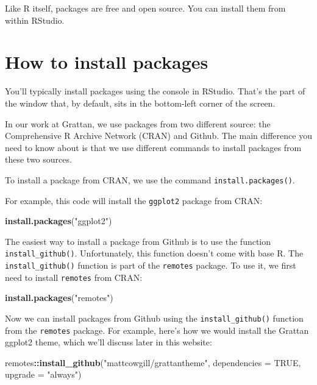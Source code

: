 \documentclass[]{book}
\newenvironment{Shaded}{\begin{snugshade}}{\end{snugshade}}
\newcommand{\DataTypeTok}[1]{\textcolor[rgb]{0.13,0.29,0.53}{#1}}
\newcommand{\KeywordTok}[1]{\textcolor[rgb]{0.13,0.29,0.53}{\textbf{#1}}}
\newcommand{\NormalTok}[1]{#1}
\newcommand{\OperatorTok}[1]{\textcolor[rgb]{0.81,0.36,0.00}{\textbf{#1}}}
\newcommand{\OtherTok}[1]{\textcolor[rgb]{0.56,0.35,0.01}{#1}}
\newcommand{\StringTok}[1]{\textcolor[rgb]{0.31,0.60,0.02}{#1}}
\begin{document}
Like R itself, packages are free and open source. You can install them from within RStudio.

\hypertarget{install-packages}{%
\section{How to install packages}\label{install-packages}}

You'll typically install packages using the console in RStudio. That's the part of the window that, by default, sits in the bottom-left corner of the screen.

In our work at Grattan, we use packages from two different source: the Comprehensive R Archive Network (CRAN) and Github. The main difference you need to know about is that we use different commands to install packages from these two sources.

To install a package from CRAN, we use the command \texttt{install.packages()}.

For example, this code will install the \texttt{ggplot2} package from CRAN:

\begin{Shaded}
\begin{Highlighting}[]
\KeywordTok{install.packages}\NormalTok{(}\StringTok{"ggplot2"}\NormalTok{)}
\end{Highlighting}
\end{Shaded}

The easiest way to install a package from Github is to use the function \texttt{install\_github()}. Unfortunately, this function doesn't come with base R. The \texttt{install\_github()} function is part of the \texttt{remotes} package. To use it, we first need to install \texttt{remotes} from CRAN:

\begin{Shaded}
\begin{Highlighting}[]
\KeywordTok{install.packages}\NormalTok{(}\StringTok{"remotes"}\NormalTok{)}
\end{Highlighting}
\end{Shaded}

Now we can install packages from Github using the \texttt{install\_github()} function from the \texttt{remotes} package. For example, here's how we would install the Grattan ggplot2 theme, which we'll discuss later in this website:

\begin{Shaded}
\begin{Highlighting}[]
\NormalTok{remotes}\OperatorTok{::}\KeywordTok{install_github}\NormalTok{(}\StringTok{"mattcowgill/grattantheme"}\NormalTok{, }\DataTypeTok{dependencies =} \OtherTok{TRUE}\NormalTok{, }\DataTypeTok{upgrade =} \StringTok{"always"}\NormalTok{)}
\end{Highlighting}
\end{Shaded}
\end{document}
